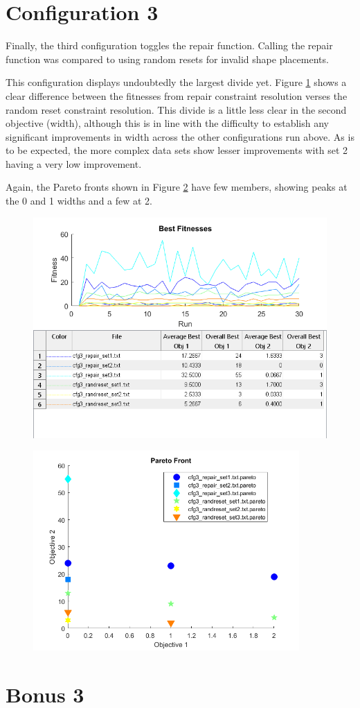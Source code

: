 \documentclass[11pt]{article}
\begin{document}
\section{Configuration 3}\label{sect:cfg3}

Finally, the third configuration toggles the repair function. Calling the repair function was compared to using random resets for invalid shape placements.

This configuration displays undoubtedly the largest divide yet. Figure \ref{fig:cfg3_best} shows a clear difference between the fitnesses from repair constraint resolution verses the random reset constraint resolution. This divide is a little less clear in the second objective (width), although this is in line with the difficulty to establish any significant improvements in width across the other configurations run above. As is to be expected, the more complex data sets show lesser improvements with set 2 having a very low improvement.

Again, the Pareto fronts shown in Figure \ref{fig:cfg3_pareto} have few members, showing peaks at the 0 and 1 widths and a few at 2.

\begin{figure}[H]
	\centering
  \includegraphics[width=5in]{assn1d_cfg3_bestfitness.png}
  \label{fig:cfg3_best}
\end{figure}

\begin{figure}[H]
	\centering
  \includegraphics[width=4in]{assn1d_cfg3_pareto.png}
  \label{fig:cfg3_pareto}
\end{figure}

\section{Bonus 3}\label{sect:bonus3}
\end{document}

